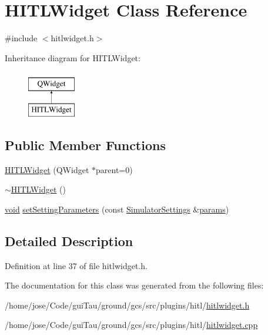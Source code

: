 \hypertarget{class_h_i_t_l_widget}{\section{H\-I\-T\-L\-Widget Class Reference}
\label{class_h_i_t_l_widget}
}


{\ttfamily \#include $<$hitlwidget.\-h$>$}

Inheritance diagram for H\-I\-T\-L\-Widget\-:\begin{figure}[H]
\begin{center}
\leavevmode
\includegraphics[height=2.000000cm]{class_h_i_t_l_widget}
\end{center}
\end{figure}
\subsection*{Public Member Functions}
\begin{DoxyCompactItemize}
\item 
\hyperlink{group___h_i_t_l_plugin_ga87da797826b0d587d7ed590e61741ca6}{H\-I\-T\-L\-Widget} (Q\-Widget $\ast$parent=0)
\item 
\hyperlink{group___h_i_t_l_plugin_gad53ecce8b7088bb11049d62819ff96f4}{$\sim$\-H\-I\-T\-L\-Widget} ()
\item 
\hyperlink{group___u_a_v_objects_plugin_ga444cf2ff3f0ecbe028adce838d373f5c}{void} \hyperlink{group___h_i_t_l_plugin_ga31d53f47fdb03b2ef1c879fa4e55ba53}{set\-Setting\-Parameters} (const \hyperlink{group___h_i_t_l_plugin_ga052199f1328d3002bce3e45345aa7f4e}{Simulator\-Settings} \&\hyperlink{glext_8h_afeb6390ab3bc8a0e96a88aff34d52288}{params})
\end{DoxyCompactItemize}


\subsection{Detailed Description}


Definition at line 37 of file hitlwidget.\-h.



The documentation for this class was generated from the following files\-:\begin{DoxyCompactItemize}
\item 
/home/jose/\-Code/gui\-Tau/ground/gcs/src/plugins/hitl/\hyperlink{hitlwidget_8h}{hitlwidget.\-h}\item 
/home/jose/\-Code/gui\-Tau/ground/gcs/src/plugins/hitl/\hyperlink{hitlwidget_8cpp}{hitlwidget.\-cpp}\end{DoxyCompactItemize}
